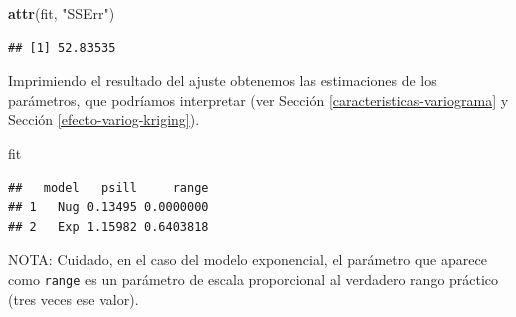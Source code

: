 \documentclass[
]{book}
\newenvironment{Shaded}{\begin{snugshade}}{\end{snugshade}}
\newcommand{\CommentTok}[1]{\textcolor[rgb]{0.56,0.35,0.01}{\textit{#1}}}
\newcommand{\DecValTok}[1]{\textcolor[rgb]{0.00,0.00,0.81}{#1}}
\newcommand{\FunctionTok}[1]{\textcolor[rgb]{0.13,0.29,0.53}{\textbf{#1}}}
\newcommand{\NormalTok}[1]{#1}
\newcommand{\OtherTok}[1]{\textcolor[rgb]{0.56,0.35,0.01}{#1}}
\newcommand{\SpecialCharTok}[1]{\textcolor[rgb]{0.81,0.36,0.00}{\textbf{#1}}}
\newcommand{\StringTok}[1]{\textcolor[rgb]{0.31,0.60,0.02}{#1}}
\theoremstyle{break}
\theoremstyle{definition}
\theoremstyle{definition}
\theoremstyle{definition}
\theoremstyle{definition}
\theoremstyle{remark}
\begin{document}
\begin{Shaded}
\begin{Highlighting}[]
\FunctionTok{attr}\NormalTok{(fit, }\StringTok{"SSErr"}\NormalTok{)}
\end{Highlighting}
\end{Shaded}

\begin{verbatim}
## [1] 52.83535
\end{verbatim}

Imprimiendo el resultado del ajuste obtenemos las estimaciones de los parámetros, que podríamos interpretar (ver Sección \ref{caracteristicas-variograma} y Sección \ref{efecto-variog-kriging}).

\begin{Shaded}
\begin{Highlighting}[]
\NormalTok{fit}
\end{Highlighting}
\end{Shaded}

\begin{verbatim}
##   model   psill     range
## 1   Nug 0.13495 0.0000000
## 2   Exp 1.15982 0.6403818
\end{verbatim}

\begin{Shaded}
\end{Shaded}

NOTA: Cuidado, en el caso del modelo exponencial, el parámetro que aparece como \texttt{range} es un parámetro de escala proporcional al verdadero rango práctico (tres veces ese valor).
\end{document}
